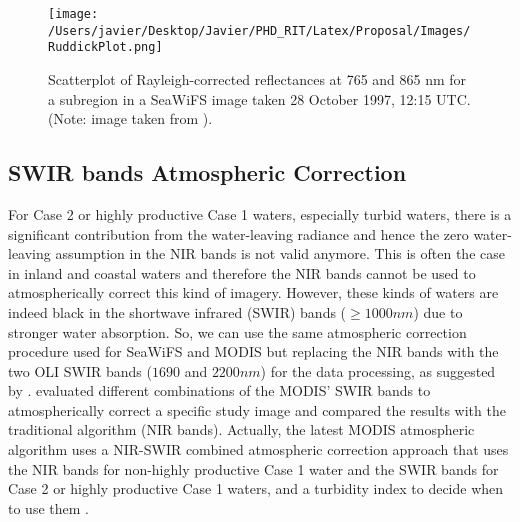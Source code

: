 \begin{figure}[htb]
  \centering
  \texttt{[image: /Users/javier/Desktop/Javier/PHD\_RIT/Latex/Proposal/Images/RuddickPlot.png]}
  \caption{Scatterplot of Rayleigh-corrected reflectances at 765 and 865 nm for a subregion in a SeaWiFS image taken 28 October 1997, 12:15 UTC.  (Note: image taken from \citet{Ruddick:2000bs}). \label{fig:ruddickplot} } 
\end{figure}

\subsection{SWIR bands Atmospheric Correction}
\label{subsec:wang}

For Case 2 or highly productive Case 1 waters, especially turbid waters, there is a significant contribution from the water-leaving radiance and hence the zero water-leaving assumption in the NIR bands is not valid anymore. This is often the case in inland and coastal waters and therefore the NIR bands cannot be used to atmospherically correct this kind of imagery. However, these kinds of waters are indeed black in the shortwave infrared (SWIR) bands ($\geq 1000nm$) due to stronger water absorption. So, we can use the same atmospheric correction procedure used for SeaWiFS and MODIS but replacing the NIR bands with the two OLI SWIR bands ($1690$ and $2200nm$) for the data processing, as suggested by \citep{Wang:2007,Wang:2005}. \citet{Wang:2007} evaluated different combinations of the MODIS' SWIR bands to atmospherically correct a specific study image and compared the results with the traditional algorithm (NIR bands). Actually, the latest MODIS atmospheric algorithm uses a NIR-SWIR combined atmospheric correction approach that uses the NIR bands for non-highly productive Case 1 water and the SWIR bands for Case 2 or highly productive Case 1 waters, and a turbidity index to decide when to use them \citep{Wang:2007dz}. 

